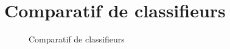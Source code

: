 \section{Comparatif de classifieurs \citep{scikit-learn}}
\begin{figure}[H]
	\centering
	\caption{Comparatif de classifieurs \citep{scikit-learn}}
	\label{comp_clf}
\end{figure}
